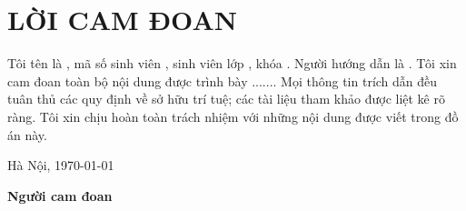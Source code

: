 \section*{LỜI CAM ĐOAN}
\thispagestyle{empty}
Tôi tên là \dotfill, mã số sinh viên \dotfill, sinh viên lớp \dotfill, khóa \dotfill. Người hướng dẫn là \dotfill. Tôi xin cam đoan toàn bộ nội dung được trình bày ....... Mọi thông tin trích dẫn đều tuân thủ các quy định về sở hữu trí tuệ; các tài liệu tham khảo được liệt kê rõ ràng. Tôi xin chịu hoàn toàn trách nhiệm với những nội dung được viết trong đồ án này.

\vspace{6pt}
\hspace{8.3cm}Hà Nội, \today

\hspace{9cm}\textbf{Người cam đoan}

\vspace{2cm}
\hspace{9.25cm}\textbf{\dotfill}
\cleardoublepage